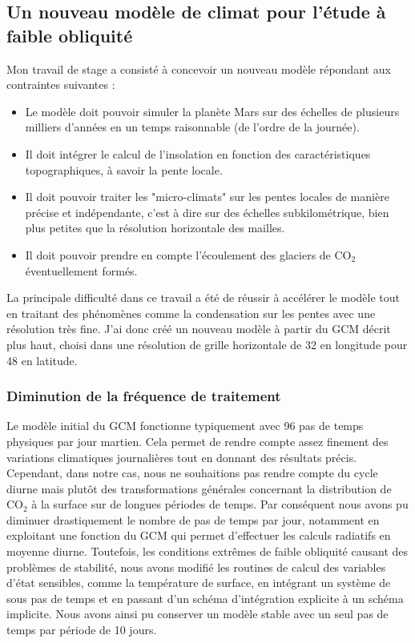 \documentclass[11pt,a4paper]{article}
\begin{document}
\subsection{Un nouveau modèle de climat pour l'étude à faible obliquité}
Mon travail de stage a consisté à concevoir un nouveau modèle répondant aux contraintes suivantes :
\begin{itemize}
\item Le modèle doit pouvoir simuler la planète Mars sur des échelles de plusieurs milliers d'années en un temps raisonnable (de l'ordre de la journée).
\item Il doit intégrer le calcul de l'insolation en fonction des caractéristiques topographiques, à savoir la pente locale.
\item Il doit pouvoir traiter les "micro-climats" sur les pentes locales de manière précise et indépendante, c'est à dire sur des échelles subkilométrique, bien plus petites que la résolution horizontale des mailles.
\item Il doit pouvoir prendre en compte l'écoulement des glaciers de CO$_2$ éventuellement formés. \\
\end{itemize}
La principale difficulté dans ce travail a été de réussir à accélérer le modèle tout en traitant des phénomènes comme la condensation sur les pentes avec une résolution très fine. J'ai donc créé un nouveau modèle à partir du GCM décrit plus haut, choisi dans une résolution de grille horizontale de 32 en longitude pour 48 en latitude. \\

\subsubsection{Diminution de la fréquence de traitement}
Le modèle initial du GCM fonctionne typiquement avec 96 pas de temps physiques par jour martien. Cela permet de rendre compte assez finement des variations climatiques journalières tout en donnant des résultats précis. Cependant, dans notre cas, nous ne souhaitions pas rendre compte du cycle diurne mais plutôt des transformations générales concernant la distribution de CO$_2$ à la surface sur de longues périodes de temps. Par conséquent nous avons pu diminuer drastiquement le nombre de pas de temps par jour, notamment en exploitant une fonction du GCM qui permet d'effectuer les calculs radiatifs en moyenne diurne. Toutefois, les conditions extrêmes de faible obliquité causant des problèmes de stabilité, nous avons modifié les routines de calcul des variables d'état sensibles, comme la température de surface, en intégrant un système de sous pas de temps et en passant d'un schéma d'intégration explicite à un schéma implicite. Nous avons ainsi pu conserver un modèle stable avec un seul pas de temps par période de 10 jours.  \\
\end{document}
